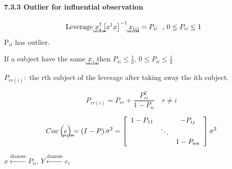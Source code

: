 \documentclass{article}
\begin{document}
\bigskip

\bigskip

\paragraph{7.3.3 Outlier for influential observation}

\begin{equation*}
\text{Leverage }%
\underaccent{\wtilde}{x}%
_{i}^{\dagger }\left[ x^{\dagger }x\right] ^{-1}%
\underaccent{\wtilde}{x}%
_{\left( i\right) }=P_{ii}\text{, }0\leq P_{ii}\leq 1
\end{equation*}%
P$_{ii}$ has outlier.

If a subject have the same $%
\underaccent{\wtilde}{x}%
$, then $P_{ii}\leq \frac{1}{a}$, $0\leq P_{ii}\leq \frac{1}{a}$

\bigskip

$P_{rr\left( i\right) }:$ the rth subject of the leverage after taking away
the ith subject.

\begin{equation*}
P_{rr\left( i\right) }=P_{rr}+\frac{P_{ri}^{2}}{1-P_{ii}}\quad r\neq i
\end{equation*}

\begin{equation*}
Cov\left( 
\underaccent{\wtilde}{e}%
\right) =\left( I-P\right) \sigma ^{2}=\left[ 
\begin{array}{ccc}
1-P_{11} &  & -P_{ij} \\ 
& \ddots &  \\ 
&  & 1-P_{nn}%
\end{array}%
\right] \sigma ^{2}
\end{equation*}

$x\overset{\text{dianose}}{\longleftarrow }P_{ii}$, $Y\overset{\text{dianose}%
}{\longleftarrow }e_{i}$
\end{document}
